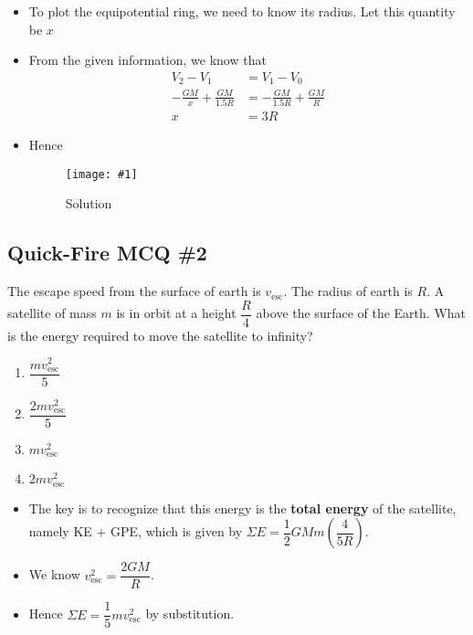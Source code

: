 \documentclass[a4paper,12pt]{article}
\newcommand{\img}[4]{\begin{center}
  \begin{figure}[H]
    \centering
    \texttt{[image: \#1]}
    \caption{#3}
    \label{fig:#4}
  \end{figure}
\end{center}}
\begin{document}
\begin{enumerate}[label=(\alph*)]
\begin{enumerate}[label=(\roman*)]
\begin{itemize}
                  \item To plot the equipotential ring, we need to know its radius. Let this quantity be $x$
                  \item From the given information, we know that \begin{align*}
                          V_2 - V_1                       & = V_1 - V_0                       \\
                          -\frac{GM}{x} + \frac{GM}{1.5R} & = -\frac{GM}{1.5R} + \frac{GM}{R} \\
                          x                               & = 3R
                        \end{align*}
                  \item Hence
                        \img{ex/6.png}{0.4}{Solution}{ex6}
                \end{itemize}
        \end{enumerate}
\end{enumerate}

\pagebreak

\subsection{Quick-Fire MCQ \#2}

The escape speed from the surface of earth is $v_\text{esc}$. The radius of earth is $R$. A satellite of mass $m$ is in orbit at a height $\dfrac{R}{4}$ above the surface of the Earth. What is the energy required to move the satellite to infinity?
\begin{enumerate}[label=\Alph*.]
  \item $\dfrac{mv_\text{esc}^2}{5}$
  \item $\dfrac{2mv_\text{esc}^2}{5}$
  \item $mv_\text{esc}^2$
  \item $2mv_\text{esc}^2$
\end{enumerate}

\begin{itemize}
  \item The key is to recognize that this energy is the \textbf{total energy} of the satellite, namely KE + GPE, which is given by $\Sigma E = \dfrac{1}{2}GMm\left(\dfrac{4}{5R}\right)$.
  \item We know $v_\text{esc}^2 = {\dfrac{2GM}{R}}$.
  \item Hence $\Sigma E = \dfrac{1}{5}mv_\text{esc}^2$ by substitution.
\end{itemize}
\end{document}
